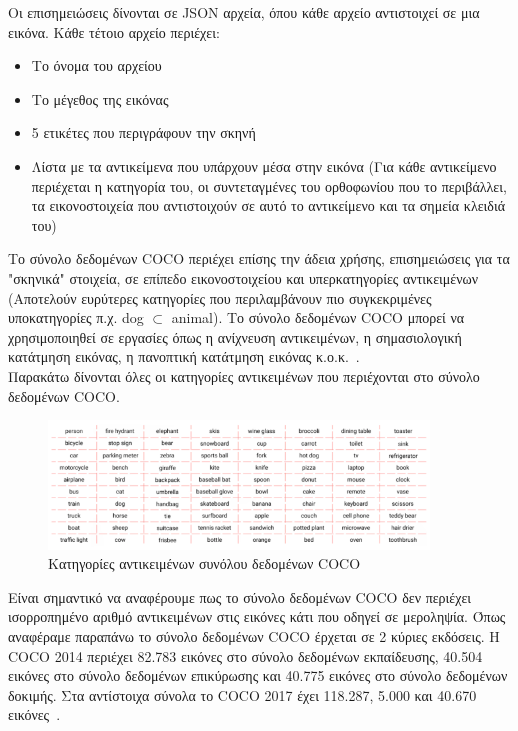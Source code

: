 \documentclass[12pt]{article}
\numberwithin{equation}{section}
\begin{document}
Οι επισημειώσεις δίνονται σε JSON αρχεία, όπου κάθε αρχείο αντιστοιχεί σε μια εικόνα. Κάθε τέτοιο αρχείο περιέχει: \\

\begin{itemize}
    \item Το όνομα του αρχείου
    \item Το μέγεθος της εικόνας
    \item 5 ετικέτες που περιγράφουν την σκηνή
     \item Λίστα με τα αντικείμενα που υπάρχουν μέσα στην εικόνα (Για κάθε αντικείμενο περιέχεται η κατηγορία του, οι συντεταγμένες του ορθοφωνίου που το περιβάλλει, τα εικονοστοιχεία που αντιστοιχούν σε αυτό το αντικείμενο και τα σημεία κλειδιά του)
\end{itemize}

Το σύνολο δεδομένων COCO περιέχει επίσης την άδεια χρήσης, επισημειώσεις για τα "σκηνικά" στοιχεία, σε επίπεδο εικονοστοιχείου και υπερκατηγορίες αντικειμένων (Αποτελούν ευρύτερες κατηγορίες που περιλαμβάνουν πιο συγκεκριμένες υποκατηγορίες π.χ. dog \(\subset\) animal). Το σύνολο δεδομένων COCO μπορεί να χρησιμοποιηθεί σε εργασίες όπως η ανίχνευση αντικειμένων, η σημασιολογική κατάτμηση εικόνας, η πανοπτική κατάτμηση εικόνας κ.ο.κ.~\cite{shah2023coco}. \\

\noindent Παρακάτω δίνονται όλες οι κατηγορίες αντικειμένων που περιέχονται στο σύνολο δεδομένων COCO.

\begin{figure}[h!]
  \centering
  \includegraphics[width=0.9\textwidth]{images/coco.png} %
  \caption{Κατηγορίες αντικειμένων συνόλου δεδομένων COCO}
  \label{figure 5}
\end{figure}

\noindent Είναι σημαντικό να αναφέρουμε πως το σύνολο δεδομένων COCO δεν περιέχει ισορροπημένο αριθμό αντικειμένων στις εικόνες κάτι που οδηγεί σε μεροληψία. Όπως αναφέραμε παραπάνω το σύνολο δεδομένων COCO έρχεται σε 2 κύριες εκδόσεις. Η COCO 2014 περιέχει 82.783 εικόνες στο σύνολο δεδομένων εκπαίδευσης, 40.504 εικόνες στο σύνολο δεδομένων επικύρωσης και 40.775 εικόνες στο σύνολο δεδομένων δοκιμής. Στα αντίστοιχα σύνολα το COCO 2017 έχει 118.287, 5.000 και 40.670 εικόνες~\cite{fan2021tao}. \\
\end{document}
